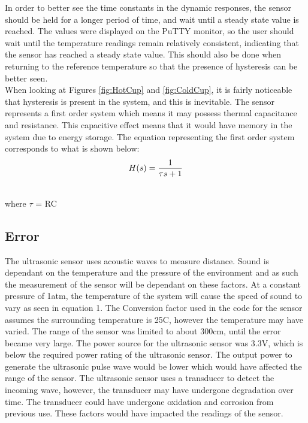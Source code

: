 \documentclass[11pt]{article}
\begin{document}
In order to better see the time constants in the dynamic responses, the sensor should be held for a longer period of time, and wait until a steady state value is reached. The values were displayed on the PuTTY monitor, so the user should wait until the temperature readings remain relatively consistent, indicating that the sensor has reached a steady state value. This should also be done when returning to the reference temperature so that the presence of hysteresis can be better seen.  \\

When looking at Figures \ref{fig:HotCup} and \ref{fig:ColdCup}, it is fairly noticeable that hysteresis is present in the system, and this is inevitable. The sensor represents a first order system which means it may possess thermal capacitance and resistance. This capacitive effect means that it would have memory in the system due to energy storage. The equation representing the first order system corresponds to what is shown below: \\

\begin{equation}
    H(s) = \frac{1}{\tau s+1} \\
\end{equation}
\begin{center}
    \\where $\tau$ = RC
\end{center}

\subsection{Error}
The ultrasonic sensor uses acoustic waves to measure distance. Sound is dependant on the temperature and the pressure of the environment and as such the measurement of the sensor will be dependant on these factors. At a constant pressure of 1atm, the temperature of the system will cause the speed of sound to vary as seen in equation 1. The Conversion factor used in the code for the sensor assumes the surrounding temperature is 25\textdegree C, however the temperature may have varied. The range of the sensor was limited to about 300cm, until the error became very large. The power source for the ultrasonic sensor was 3.3V, which is below the required power rating of the ultrasonic sensor. The output power to generate the ultrasonic pulse wave would be lower which would have affected the range of the sensor. The ultrasonic sensor uses a transducer to detect the incoming wave, however, the transducer may have undergone degradation over time. The transducer could have undergone oxidation and corrosion from previous use. These factors would have impacted the readings of the sensor.\\
\end{document}

